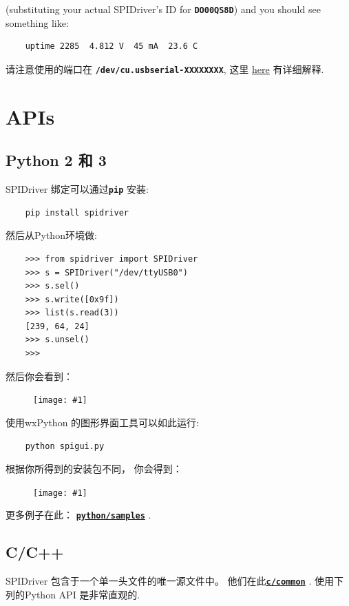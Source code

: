 \documentclass{article}
\newcommand{\png}[1]{
\begin{figure}[H]
\begin{center}
\texttt{[image: \#1]}
\end{center}
\end{figure}
}
\newcommand{\mach}[1]{\texttt{\textbf{#1}}}
\begin{document}
(substituting your actual SPIDriver's ID for \mach{DO00QS8D})
and you should see something like:
\begin{lstlisting}
    uptime 2285  4.812 V  45 mA  23.6 C
\end{lstlisting}

请注意使用的端口在 \mach{/dev/cu.usbserial-XXXXXXXX}, 这里 \href{https://pbxbook.com/other/mac-tty.html}{here} 有详细解释.

\section{APIs}
\subsection{Python 2 和 3}

SPIDriver 绑定可以通过\mach{pip} 安装:

\begin{lstlisting}
    pip install spidriver
\end{lstlisting}

然后从Python环境做:

\begin{lstlisting}
    >>> from spidriver import SPIDriver
    >>> s = SPIDriver("/dev/ttyUSB0") 
    >>> s.sel()                       
    >>> s.write([0x9f])               
    >>> list(s.read(3))              
    [239, 64, 24]
    >>> s.unsel()                     
    >>>
\end{lstlisting}

然后你会看到：
\png{img/spidriver/spidriver-flash}

使用wxPython 的图形界面工具可以如此运行:

\begin{lstlisting}
    python spigui.py
\end{lstlisting}

根据你所得到的安装包不同， 你会得到： 

\png{img/spidriver/spidriver-gui-linux}

更多例子在此： 
\href{https://github.com/jamesbowman/spidriver/tree/master/python/samples}{\mach{python/samples}} .

\subsection{C/C++}

SPIDriver 包含于一个单一头文件的唯一源文件中。 
他们在此\href{https://github.com/jamesbowman/spidriver/tree/master/c/common}{\mach{c/common}} .
使用下列的Python API 是非常直观的.
\end{document}
